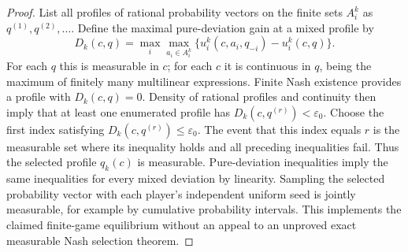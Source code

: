 \documentclass[11pt]{article}
\theoremstyle{remark}\newtheorem{remark}[theorem]{Remark}
\begin{document}
\begin{proof}
List all profiles of rational probability vectors on the finite sets
$A_i^k$ as $q^{(1)},q^{(2)},\ldots$. Define the maximal pure-deviation
gain at a mixed profile by
\[
 D_k(c,q)=\max_i\max_{a_i\in A_i^k}
        \{u_i^k(c,a_i,q_{-i})-u_i^k(c,q)\}.
\]
For each $q$ this is measurable in $c$; for each $c$ it is continuous
in $q$, being the maximum of finitely many multilinear expressions.
Finite Nash existence provides a profile with $D_k(c,q)=0$.
Density of rational profiles and continuity then imply that at least
one enumerated profile has $D_k(c,q^{(r)})<\varepsilon_0$.
Choose the first index satisfying $D_k(c,q^{(r)})\leq\varepsilon_0$.
The event that this index equals $r$ is the measurable set where its
inequality holds and all preceding inequalities fail. Thus the selected
profile $q_k(c)$ is measurable. Pure-deviation inequalities imply the
same inequalities for every mixed deviation by linearity.
Sampling the selected probability vector with each player's independent
uniform seed is jointly measurable, for example by cumulative probability
intervals. This implements the claimed finite-game equilibrium without
an appeal to an unproved exact measurable Nash selection theorem.
\end{proof}
\end{document}
